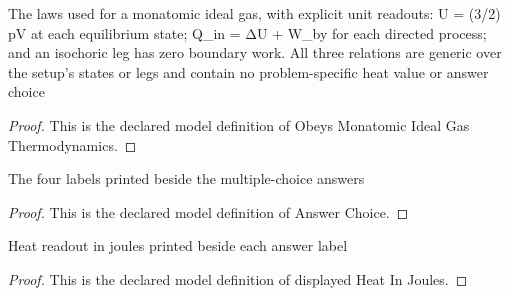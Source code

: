 \begin{definition}
  \label{def:physics:phyx-mini-0412:phyxminiproblems-problemphyxmini0412-obeysmonatomicidealgasthermodynamics}
  The laws used for a monatomic ideal gas, with explicit unit readouts: U = (3/2) pV at each equilibrium state; Q\_in = ΔU + W\_by for each directed process; and an isochoric leg has zero boundary work. All three relations are generic over the setup's states or legs and contain no problem-specific heat value or answer choice
\end{definition}
\begin{proof}
  This is the declared model definition of Obeys Monatomic Ideal Gas Thermodynamics.
\end{proof}
\begin{definition}
  \label{def:physics:phyx-mini-0412:phyxminiproblems-problemphyxmini0412-answerchoice}
  The four labels printed beside the multiple-choice answers
\end{definition}
\begin{proof}
  This is the declared model definition of Answer Choice.
\end{proof}
\begin{definition}
  \label{def:physics:phyx-mini-0412:phyxminiproblems-problemphyxmini0412-displayedheatinjoules}
  Heat readout in joules printed beside each answer label
\end{definition}
\begin{proof}
  This is the declared model definition of displayed Heat In Joules.
\end{proof}
